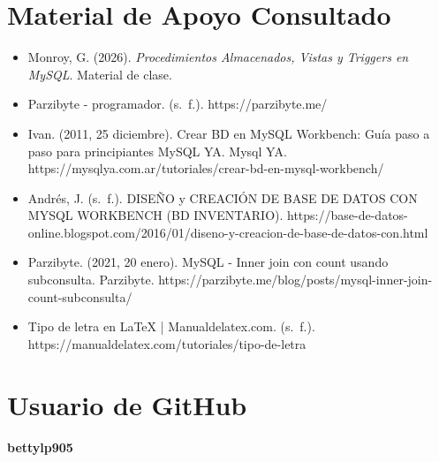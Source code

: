 \documentclass[10pt,letterpaper]{article}
\begin{document}
\section{Material de Apoyo Consultado}
\begin{itemize}
    \item Monroy, G. (2026). \textit{Procedimientos Almacenados, Vistas y Triggers en MySQL}. Material de clase.
    \item Parzibyte - programador. (s. f.). https://parzibyte.me/
    \item Ivan. (2011, 25 diciembre). Crear BD en MySQL Workbench: Guía paso a paso para principiantes 
     MySQL YA. Mysql YA. https://mysqlya.com.ar/tutoriales/crear-bd-en-mysql-workbench/
    \item Andrés, J. (s. f.). DISEÑO y CREACIÓN DE BASE DE DATOS CON MYSQL WORKBENCH (BD INVENTARIO).
     https://base-de-datos-online.blogspot.com/2016/01/diseno-y-creacion-de-base-de-datos-con.html
    \item Parzibyte. (2021, 20 enero). MySQL - Inner join con count usando subconsulta. 
    Parzibyte. https://parzibyte.me/blog/posts/mysql-inner-join-count-subconsulta/
    \item Tipo de letra en LaTeX | Manualdelatex.com. (s. f.). https://manualdelatex.com/tutoriales/tipo-de-letra
    
\end{itemize} 

\section{Usuario de GitHub}
\textbf{bettylp905}
\end{document}
